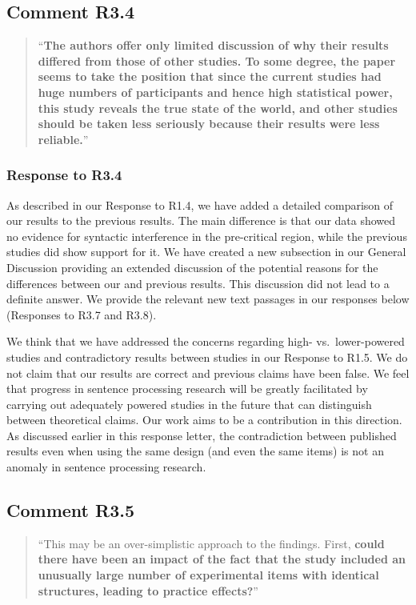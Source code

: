 \documentclass[12pt]{article}
\begin{document}
\subsection*{Comment R3.4}
\begin{quote}
``\textbf{The authors offer only limited discussion of why their results differed from those of other studies. To some degree, the paper seems to take the position that since the current studies had huge numbers of participants and hence high statistical power, this study reveals the true state of the world, and other studies should be taken less seriously because their results were less reliable.}''
\end{quote}

\subsubsection*{Response to R3.4}
As described in our Response to R1.4, we have added a detailed comparison of our results to the previous results. The main difference is that our data showed no evidence for syntactic interference in the pre-critical region, while the previous studies did show support for it. We have created a new subsection in our General Discussion providing an extended discussion of the potential reasons for the differences between our and previous results. This discussion did not lead to a definite answer. We provide the relevant new text passages in our responses below (Responses to R3.7 and R3.8).

We think that we have addressed the concerns regarding high- vs.\ lower-powered studies and contradictory results between studies in our Response to R1.5. We do not claim that our results are correct and previous claims have been false. We feel that progress in sentence processing research will be greatly facilitated by carrying out adequately powered studies in the future that can
distinguish between theoretical claims. Our work aims to be a contribution in this direction. As discussed earlier in this response letter, the contradiction between published results even when using the same design (and even the same items) is not an anomaly in sentence processing research.

\subsection*{Comment R3.5}
\begin{quote}
``This may be an over-simplistic approach to the findings. First, \textbf{could there have been an impact of the fact that the study included an unusually large number of experimental items with identical structures, leading to practice effects?}''
\end{quote}
\end{document}
